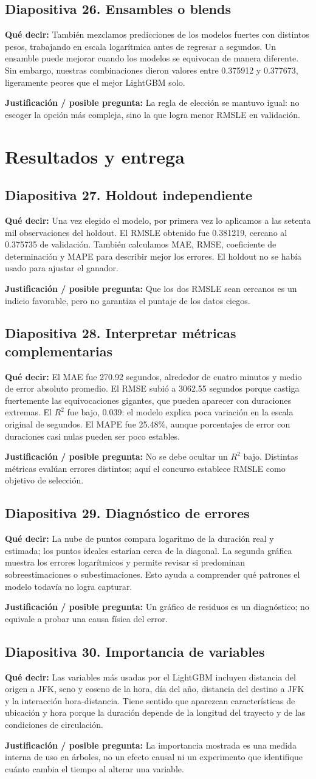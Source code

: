 \documentclass[11pt,letterpaper]{article}
\newcommand{\lamina}[2]{\subsection*{Diapositiva #1. #2}}
\newcommand{\explica}[1]{\noindent\textcolor{azul}{\textbf{Qué decir:}} #1\par\smallskip}
\newcommand{\defiende}[1]{\noindent\textcolor{verde}{\textbf{Justificación / posible pregunta:}} #1\par\medskip}
\begin{document}
\lamina{26}{Ensambles o blends}
\explica{También mezclamos predicciones de los modelos fuertes con distintos pesos, trabajando en escala logarítmica antes de regresar a segundos. Un ensamble puede mejorar cuando los modelos se equivocan de manera diferente. Sin embargo, nuestras combinaciones dieron valores entre 0.375912 y 0.377673, ligeramente peores que el mejor LightGBM solo.}
\defiende{La regla de elección se mantuvo igual: no escoger la opción más compleja, sino la que logra menor RMSLE en validación.}

\section{Resultados y entrega}
\lamina{27}{Holdout independiente}
\explica{Una vez elegido el modelo, por primera vez lo aplicamos a las setenta mil observaciones del holdout. El RMSLE obtenido fue 0.381219, cercano al 0.375735 de validación. También calculamos MAE, RMSE, coeficiente de determinación y MAPE para describir mejor los errores. El holdout no se había usado para ajustar el ganador.}
\defiende{Que los dos RMSLE sean cercanos es un indicio favorable, pero no garantiza el puntaje de los datos ciegos.}

\lamina{28}{Interpretar métricas complementarias}
\explica{El MAE fue 270.92 segundos, alrededor de cuatro minutos y medio de error absoluto promedio. El RMSE subió a 3062.55 segundos porque castiga fuertemente las equivocaciones gigantes, que pueden aparecer con duraciones extremas. El $R^2$ fue bajo, 0.039: el modelo explica poca variación en la escala original de segundos. El MAPE fue 25.48\%, aunque porcentajes de error con duraciones casi nulas pueden ser poco estables.}
\defiende{No se debe ocultar un $R^2$ bajo. Distintas métricas evalúan errores distintos; aquí el concurso establece RMSLE como objetivo de selección.}

\lamina{29}{Diagnóstico de errores}
\explica{La nube de puntos compara logaritmo de la duración real y estimada; los puntos ideales estarían cerca de la diagonal. La segunda gráfica muestra los errores logarítmicos y permite revisar si predominan sobreestimaciones o subestimaciones. Esto ayuda a comprender qué patrones el modelo todavía no logra capturar.}
\defiende{Un gráfico de residuos es un diagnóstico; no equivale a probar una causa física del error.}

\lamina{30}{Importancia de variables}
\explica{Las variables más usadas por el LightGBM incluyen distancia del origen a JFK, seno y coseno de la hora, día del año, distancia del destino a JFK y la interacción hora-distancia. Tiene sentido que aparezcan características de ubicación y hora porque la duración depende de la longitud del trayecto y de las condiciones de circulación.}
\defiende{La importancia mostrada es una medida interna de uso en árboles, no un efecto causal ni un experimento que identifique cuánto cambia el tiempo al alterar una variable.}
\end{document}
